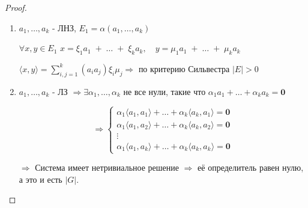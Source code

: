 \vspace{0.2cm}
\begin{proof}
\leavevmode \newline
    \begin{enumerate}
        \item ${a_{1}, \ldots, a_{k}}$ - ЛНЗ, \quad $E_{1} = \alpha(a_{1}, \ldots, a_{k})$ 
        \newline 
        
        $\forall x, y \in E_{1}$ \quad  $x = \xi_{1} a_{1} \; + \; \ldots \; + \; \xi_{k} a_{k}, \quad y = \mu_{1} a_{1} \; + \; \ldots \; + \; \mu_{k} a_{k}$ 
        \newline 
        
        $\langle x, y \rangle = \sum\limits_{i, j = 1}^{k} (a_{i} a_{j}) \xi_{i} \mu_{j} \Longrightarrow$ по критерию Сильвестра $|E| > 0$
        \newline 
        
        \item ${a_{1}, \ldots, a_{k}}$ - ЛЗ \; $\Longrightarrow \exists \alpha_{1}, \ldots, \alpha_{k}$ не все нули, такие что $\alpha_{1} a_{1} + \ldots + \alpha_{k} a_{k} = \boldsymbol{0}$
        \newline
        
        
    \[
    \Longrightarrow
        \begin{cases}
            \alpha_{1} \langle a_1, a_{1} \rangle + \ldots + \alpha_{k} \langle a_{k}, a_{1} \rangle = \mathbf{0} \\
            \alpha_{1} \langle a_{1}, a_{2} \rangle + \ldots + \alpha_{k} \langle a_{k}, a_{2} \rangle = \mathbf{0} \\
            \vdots \\
            
            \alpha_{1} \langle a_{1}, a_{k} \rangle + \ldots + \alpha_{k} \langle a_{k}, a_{k} \rangle = \mathbf{0}
        \end{cases}
    \]
    \newline
    
    $\Longrightarrow$ Система имеет нетривиальное решение $\Longrightarrow$ её определитель равен нулю, а это и есть $|G|.$
    \end{enumerate}
\end{proof}

\clearpage
